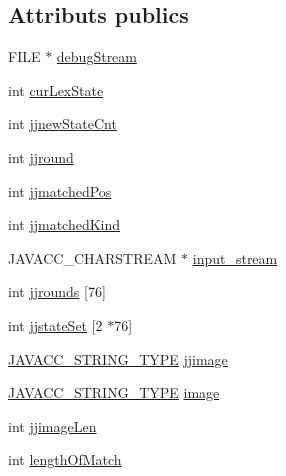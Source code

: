 \subsection*{Attributs publics}
\begin{DoxyCompactItemize}
\item 
F\+I\+L\+E $\ast$ \hyperlink{classvhdl_1_1parser_1_1_vhdl_parser_token_manager_ae2a699d98997f24989251c851f62794a}{debug\+Stream}
\item 
int \hyperlink{classvhdl_1_1parser_1_1_vhdl_parser_token_manager_a36bbd9f08891133c60bbda671c6a8086}{cur\+Lex\+State}
\item 
int \hyperlink{classvhdl_1_1parser_1_1_vhdl_parser_token_manager_a273f67185bce35e5c93086983e4d68f5}{jjnew\+State\+Cnt}
\item 
int \hyperlink{classvhdl_1_1parser_1_1_vhdl_parser_token_manager_ac7fc6862ddbb484070c0b19cb6503fd6}{jjround}
\item 
int \hyperlink{classvhdl_1_1parser_1_1_vhdl_parser_token_manager_a2d97e8149d766f4631a1c10a47a7c1f1}{jjmatched\+Pos}
\item 
int \hyperlink{classvhdl_1_1parser_1_1_vhdl_parser_token_manager_a05289c5f5824fa5bc43e862149d0fcf0}{jjmatched\+Kind}
\item 
J\+A\+V\+A\+C\+C\+\_\+\+C\+H\+A\+R\+S\+T\+R\+E\+A\+M $\ast$ \hyperlink{classvhdl_1_1parser_1_1_vhdl_parser_token_manager_a10a3c151278a480d9e4bb00d5407fcdc}{input\+\_\+stream}
\item 
int \hyperlink{classvhdl_1_1parser_1_1_vhdl_parser_token_manager_aae221edf1aa2073c129cbc5e4909f531}{jjrounds} \mbox{[}76\mbox{]}
\item 
int \hyperlink{classvhdl_1_1parser_1_1_vhdl_parser_token_manager_a99c4e00c6763674fb9279b74298acabf}{jjstate\+Set} \mbox{[}2 $\ast$76\mbox{]}
\item 
\hyperlink{_java_c_c_8h_a7941da0682a76ffa9869d8458e166062}{J\+A\+V\+A\+C\+C\+\_\+\+S\+T\+R\+I\+N\+G\+\_\+\+T\+Y\+P\+E} \hyperlink{classvhdl_1_1parser_1_1_vhdl_parser_token_manager_af3536eaedbccc65fdfc9a48980bceba5}{jjimage}
\item 
\hyperlink{_java_c_c_8h_a7941da0682a76ffa9869d8458e166062}{J\+A\+V\+A\+C\+C\+\_\+\+S\+T\+R\+I\+N\+G\+\_\+\+T\+Y\+P\+E} \hyperlink{classvhdl_1_1parser_1_1_vhdl_parser_token_manager_a6e5106f2a45c32ec7920da5262fcbfa6}{image}
\item 
int \hyperlink{classvhdl_1_1parser_1_1_vhdl_parser_token_manager_ac294054608204dd471e772c2e421f093}{jjimage\+Len}
\item 
int \hyperlink{classvhdl_1_1parser_1_1_vhdl_parser_token_manager_a6d05b89884c43044653109f5cb9d7621}{length\+Of\+Match}

\end{DoxyCompactItemize}
